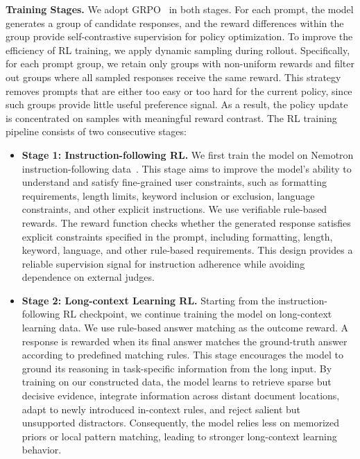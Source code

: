 \documentclass{llmxive}
\begin{document}
\textbf{Training Stages.} We adopt GRPO~\citep{shao2024deepseekmath} in both stages. For each prompt, the model generates a group of candidate responses, and the reward differences within the group provide self-contrastive supervision for policy optimization. To improve the efficiency of RL training, we apply dynamic sampling during rollout. Specifically, for each prompt group, we retain only groups with non-uniform rewards and filter out groups where all sampled responses receive the same reward. This strategy removes prompts that are either too easy or too hard for the current policy, since such groups provide little useful preference signal. As a result, the policy update is concentrated on samples with meaningful reward contrast. The RL training pipeline consists of two consecutive stages:
\begin{itemize}
    \item \textbf{Stage 1: Instruction-following RL.} 
    We first train the model on Nemotron instruction-following data~\citep{nemo-gym}. This stage aims to improve the model's ability to understand and satisfy fine-grained user constraints, such as formatting requirements, length limits, keyword inclusion or exclusion, language constraints, and other explicit instructions.  We use verifiable rule-based rewards. The reward function checks whether the generated response satisfies explicit constraints specified in the prompt, including formatting, length, keyword, language, and other rule-based requirements. This design provides a reliable supervision signal for instruction adherence while avoiding dependence on external judges.

    \item \textbf{Stage 2: Long-context Learning RL.}
    Starting from the instruction-following RL checkpoint, we continue training the model on long-context learning data. We use rule-based answer matching as the outcome reward. A response is rewarded when its final answer matches the ground-truth answer according to predefined matching rules. This stage encourages the model to ground its reasoning in task-specific information from the long input. By training on our constructed data, the model learns to retrieve sparse but decisive evidence, integrate information across distant document locations, adapt to newly introduced in-context rules, and reject salient but unsupported distractors. Consequently, the model relies less on memorized priors or local pattern matching, leading to stronger long-context learning behavior.
\end{itemize}
\end{document}
